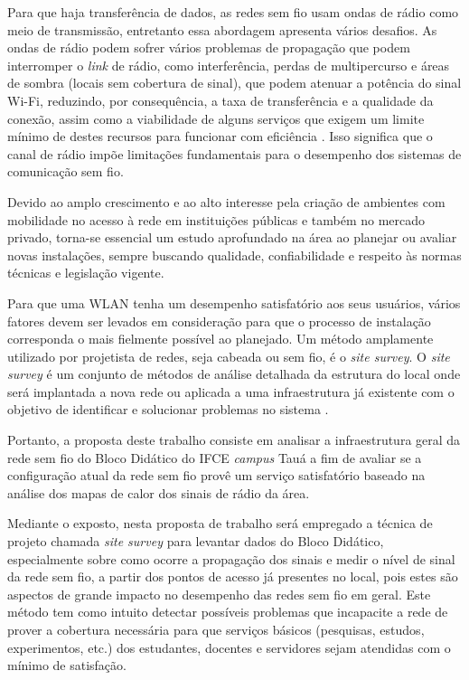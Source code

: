 Para que haja transferência de dados, as redes sem fio usam ondas de rádio como meio de transmissão, entretanto essa abordagem apresenta vários desafios. As ondas de rádio podem sofrer vários problemas de propagação que podem interromper o \textit{link} de rádio, como interferência, perdas de multipercurso e áreas de sombra (locais sem cobertura de sinal), que podem atenuar a potência do sinal Wi-Fi, reduzindo, por consequência, a taxa de transferência e a qualidade da conexão, assim como a viabilidade de alguns serviços que exigem um limite mínimo de destes recursos para funcionar com eficiência
 \cite{gast2002}. Isso significa que o canal de rádio impõe limitações fundamentais para o desempenho dos sistemas de comunicação sem fio.
 
Devido ao amplo crescimento e ao alto interesse pela criação de ambientes com mobilidade no acesso à rede em instituições públicas e também no mercado privado, torna-se essencial um estudo aprofundado na área ao planejar ou avaliar novas instalações, sempre buscando qualidade, confiabilidade e respeito às normas técnicas e legislação vigente.

Para que uma WLAN tenha um desempenho satisfatório aos seus usuários, vários fatores devem ser levados em consideração para que o processo de instalação corresponda o mais fielmente possível ao planejado. Um método amplamente utilizado por projetista de redes, seja cabeada ou sem fio, é o \textit{site survey}. O \textit{site survey} é um conjunto de métodos de análise detalhada da estrutura do local onde será implantada a nova rede ou aplicada a uma infraestrutura já existente com o objetivo de identificar e solucionar problemas no sistema \cite{pinheiro2004site}.

Portanto, a proposta deste trabalho consiste em analisar a infraestrutura geral da rede sem fio do Bloco Didático do IFCE \textit{campus} Tauá a fim de avaliar se a configuração atual da rede sem fio provê um serviço satisfatório baseado na análise dos mapas de calor dos sinais de rádio da área.

Mediante o exposto, nesta proposta de trabalho será empregado a técnica de projeto chamada \textit{site survey} para levantar dados do Bloco Didático, especialmente sobre como ocorre a propagação dos sinais e medir o nível de sinal da rede sem fio, a partir dos pontos de acesso já presentes no local, pois estes são aspectos de grande impacto no desempenho das redes sem fio em geral.  Este método tem como intuito detectar possíveis problemas que incapacite a rede de prover a cobertura necessária para que serviços básicos (pesquisas, estudos, experimentos, etc.) dos estudantes, docentes e servidores sejam atendidas com o mínimo de satisfação.

